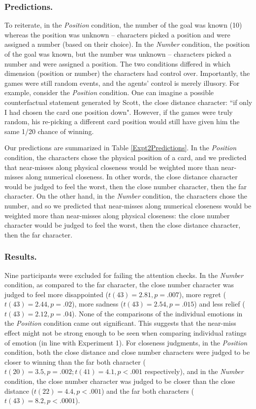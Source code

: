 \documentclass[10pt,letterpaper]{article}
\begin{document}
\subsubsection{Predictions.}
	To reiterate, in the \textit{Position} condition, the number of the goal was known (10) whereas the position was unknown -- characters picked a position and were assigned a number (based on their choice). In the \textit{Number} condition, the position of the goal was known, but the number was unknown -- characters picked a number and were assigned a position. The two conditions differed in which dimension (position or number) the characters had control over. Importantly, the games were still random events, and the agents' control is merely illusory. For example, consider the \textit{Position} condition. One can imagine a possible counterfactual statement generated by Scott, the close distance character: ``if only I had chosen the card one position down". However, if the games were truly random, his re-picking a different card position would still have given him the same 1/20 chance of winning.

	Our predictions are summarized in Table \ref{Expt2Predictions}. In the \textit{Position} condition, the characters chose the physical position of a card, and we predicted that near-misses along physical closeness would be weighted more than near-misses along numerical closeness. In other words, the close distance character would be judged to feel the worst, then the close number character, then the far character. On the other hand, in the \textit{Number} condition, the characters chose the number, and so we predicted that near-misses along numerical closeness would be weighted more than near-misses along physical closeness: the close number character would be judged to feel the worst, then the close distance character, then the far character.


\subsubsection{Results.} Nine participants were excluded for failing the attention checks. In the \textit{Number} condition, as compared to the far character, the close number character was judged to feel more disappointed ($t(43)=2.81, p=.007$), more regret ($t(43)=2.44, p=.02$), more sadness ($t(43)=2.54, p=.015$) and less relief ($t(43)=2.12, p=.04$). None of the comparisons of the individual emotions in the \textit{Position} condition came out significant. This suggests that the near-miss effect might not be strong enough to be seen when comparing individual ratings of emotion (in line with Experiment 1). For closeness judgments, in the \textit{Position} condition, both the close distance and close number characters were judged to be closer to winning than the far both character ($t(20)=3.5, p=.002; t(41)=4.1, p<.001$ respectively), and in the \textit{Number} condition, the close number character was judged to be closer than the close distance ($t(22)=4.4, p<.001$) and the far both characters ($t(43)=8.2, p<.0001$).
\end{document}
